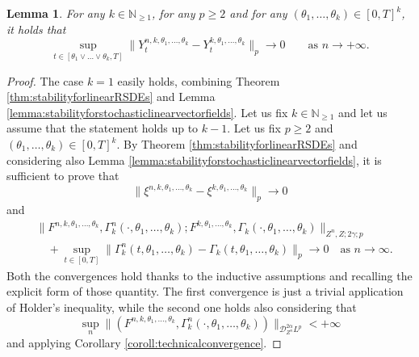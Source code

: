 \documentclass[11pt,a4paper]{article}
\newcommand{\E}{\mathbb{E}}
\theoremstyle{plain}
\newtheorem{lemma}[defn]{Lemma}
\begin{document}
\begin{lemma}\label{lemma:stabilityforlinearsmoothRSDEs}
    For any $k \in \mathbb{N}_{\ge 1}$, for any $p\ge 2$ and for any $(\theta_1, \ldots, \theta_k)\in [0, T]^k$, it holds that \begin{equation*}
         \sup_{t \in [\theta_1 \vee \dots \vee \theta_k, T]} \|Y_t^{n, k,\theta_1, \ldots, \theta_k} - Y_t^{k, \theta_1, \ldots, \theta_k} \|_p \to 0 \qquad \text{as $n \rightarrow + \infty$.}
    \end{equation*}
\end{lemma}

\begin{proof}
  The case $k=1$ easily holds, combining Theorem \ref{thm:stabilityforlinearRSDEs} and Lemma \ref{lemma:stabilityforstochasticlinearvectorfields}.
  Let us fix $k \in \mathbb{N}_{\ge 1}$ and let us assume that the statement holds up to
  $k - 1$. Let us fix $p \ge 2$ and $(\theta_1,
  \dots, \theta_k) \in [0, T]^k$.
  By Theorem \ref{thm:stabilityforlinearRSDEs} and considering also Lemma \ref{lemma:stabilityforstochasticlinearvectorfields}, it is
  sufficient to prove that \begin{equation*}
      \| \xi^{n, k, \theta_1, \ldots, \theta_k} - \xi^{k, \theta_1, \ldots,
     \theta_k} \|_p \rightarrow 0
  \end{equation*}
  and \begin{align*}
     &\|F^{n, k, \theta_1, \dots, \theta_k}, \Gamma_k^n(\cdot,\theta_1,\dots,\theta_k) ; F^{k, \theta_1, \dots,\theta_k}, \Gamma_k(\cdot,\theta_1,\dots,\theta_k) \|_{Z^n,Z;2\gamma;p} \\
     & \quad + \sup_{t\in [0,T]} \|\Gamma_k^n(t,\theta_1,\dots,\theta_k)-\Gamma_k(t,\theta_1,\dots,\theta_k)\|_p
     \to 0 \quad \text{as $n\to \infty$}.
  \end{align*}
  Both
  the convergences hold thanks to the inductive assumptions and recalling the
  explicit form of those quantity. The first convergence is just a trivial
  application of Holder's inequality, while the second one holds also
  considering that
  \[ \sup_n \| (F^{n, k, \theta_1, \ldots, \theta_k}, \Gamma_k^n(\cdot,\theta_1,\dots,\theta_k)) \|_{\mathscr{D}_{Z^n}^{2 \alpha} L^p} < + \infty \]
  and applying Corollary \ref{coroll:technicalconvergence}. 
\end{proof}
\end{document}
